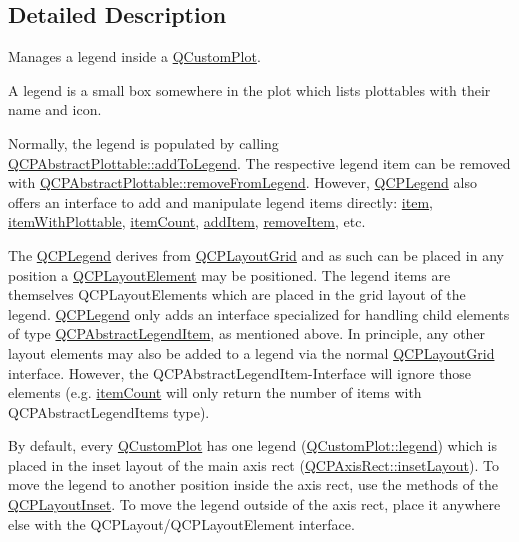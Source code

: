 \subsection{Detailed Description}
Manages a legend inside a \hyperlink{classQCustomPlot}{Q\+Custom\+Plot}. 

A legend is a small box somewhere in the plot which lists plottables with their name and icon.

Normally, the legend is populated by calling \hyperlink{classQCPAbstractPlottable_a70f8cabfd808f7d5204b9f18c45c13f5}{Q\+C\+P\+Abstract\+Plottable\+::add\+To\+Legend}. The respective legend item can be removed with \hyperlink{classQCPAbstractPlottable_aa1f350e510326d012b9a9c9249736c83}{Q\+C\+P\+Abstract\+Plottable\+::remove\+From\+Legend}. However, \hyperlink{classQCPLegend}{Q\+C\+P\+Legend} also offers an interface to add and manipulate legend items directly\+: \hyperlink{classQCPLegend_a454272d7094437beb3278a2294006da5}{item}, \hyperlink{classQCPLegend_a5ee80cf83f65e3b6dd386942ee3cc1ee}{item\+With\+Plottable}, \hyperlink{classQCPLegend_a198228e9cdc78d3a3c306fa6763d0404}{item\+Count}, \hyperlink{classQCPLegend_a3ab274de52d2951faea45a6d975e6b3f}{add\+Item}, \hyperlink{classQCPLegend_ac91595c3eaa746fe6321d2eb952c63bb}{remove\+Item}, etc.

The \hyperlink{classQCPLegend}{Q\+C\+P\+Legend} derives from \hyperlink{classQCPLayoutGrid}{Q\+C\+P\+Layout\+Grid} and as such can be placed in any position a \hyperlink{classQCPLayoutElement}{Q\+C\+P\+Layout\+Element} may be positioned. The legend items are themselves Q\+C\+P\+Layout\+Elements which are placed in the grid layout of the legend. \hyperlink{classQCPLegend}{Q\+C\+P\+Legend} only adds an interface specialized for handling child elements of type \hyperlink{classQCPAbstractLegendItem}{Q\+C\+P\+Abstract\+Legend\+Item}, as mentioned above. In principle, any other layout elements may also be added to a legend via the normal \hyperlink{classQCPLayoutGrid}{Q\+C\+P\+Layout\+Grid} interface. However, the Q\+C\+P\+Abstract\+Legend\+Item-\/\+Interface will ignore those elements (e.\+g. \hyperlink{classQCPLegend_a198228e9cdc78d3a3c306fa6763d0404}{item\+Count} will only return the number of items with Q\+C\+P\+Abstract\+Legend\+Items type).

By default, every \hyperlink{classQCustomPlot}{Q\+Custom\+Plot} has one legend (\hyperlink{classQCustomPlot_a4eadcd237dc6a09938b68b16877fa6af}{Q\+Custom\+Plot\+::legend}) which is placed in the inset layout of the main axis rect (\hyperlink{classQCPAxisRect_a4114887c7141b59650b7488f930993e5}{Q\+C\+P\+Axis\+Rect\+::inset\+Layout}). To move the legend to another position inside the axis rect, use the methods of the \hyperlink{classQCPLayoutInset}{Q\+C\+P\+Layout\+Inset}. To move the legend outside of the axis rect, place it anywhere else with the Q\+C\+P\+Layout/\+Q\+C\+P\+Layout\+Element interface. 

